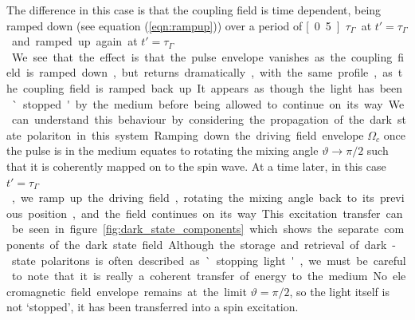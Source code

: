    The difference in this case is that the coupling field is time dependent,
    being ramped down (see equation (\ref{eqn:rampup})) over a period of
    \unit[0.5]{$\tau_\Gamma$} at $t' = $\unit[4]{$\tau_\Gamma$} and ramped up
    again at $t' = $\unit[8]{$\tau_\Gamma$}.

    We see that the effect is that the pulse envelope vanishes as the coupling
    field is ramped down, but returns dramatically, with the same profile, as
    the coupling field is ramped back up. It appears as though the light has
    been `stopped' by the medium before being allowed to continue on its way. 

    We can understand this behaviour by considering the propagation of the dark
    state polariton in this system. Ramping down the driving field envelope
    $\Omega_c$ once the pulse is in the medium equates to rotating the mixing
    angle $\vartheta \rightarrow \pi/2$ such that it is coherently mapped on to
    the spin wave. At a time later, in this case $t' = $\unit[8]{$\tau_\Gamma$},
    we ramp up the driving field, rotating the mixing angle back to its previous
    position, and the field continues on its way. This excitation transfer can
    be seen in figure \ref{fig:dark_state_components} which shows the separate
    components of the dark state field.

    Although the storage and retrieval of dark-state polaritons is often
    described as `stopping light', we must be careful to note that it is really
    a coherent transfer of energy to the medium. No elecromagnetic field
    envelope remains at the limit $\vartheta = \pi/2$, so the light itself is
    not `stopped', it has been transferred into a spin excitation.\cite{Fleischhauer2000}

